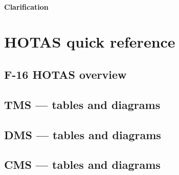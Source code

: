 \documentclass[11pt, a4paper, twoside]{report}
\begin{document}
\subsubsection{Clarification}
\label{sec:C5-S3-S1-S3}

\newpage

\chapter{HOTAS quick reference}
\label{chap:C6}

\section{F-16 HOTAS overview}
\label{sec:C6-S1}

\section{TMS --- tables and diagrams}
\label{sec:C6-S2}

\section{DMS --- tables and diagrams}
\label{sec:C6-S3}

\section{CMS --- tables and diagrams}
\label{sec:C6-S4}
\end{document}
